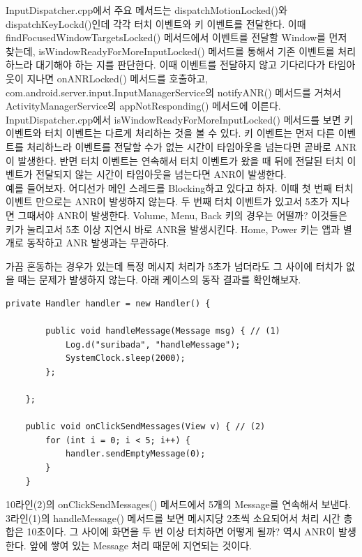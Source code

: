 InputDispatcher.cpp에서 주요 메서드는 dispatchMotionLocked()와 dispatchKeyLockd()인데 각각 터치 이벤트와 키 이벤트를 전달한다. 이때 findFocusedWindowTargetsLocked() 메서드에서 이벤트를 전달할 Window를 먼저 찾는데, isWindowReadyForMoreInputLocked() 메서드를 통해서 기존 이벤트를 처리하느라 대기해야 하는 지를 판단한다.
이때 이벤트를 전달하지 않고 기다리다가 타임아웃이 지나면 onANRLocked() 메서드를 호출하고, com.android.server.input.InputManagerService의 notifyANR() 메서드를 거쳐서 ActivityManagerService의 appNotResponding() 메서드에 이른다.\\

InputDispatcher.cpp에서 isWindowReadyForMoreInputLocked() 메서드를 보면 키 이벤트와 터치 이벤트는 다르게 처리하는 것을 볼 수 있다. 키 이벤트는 먼저 다른 이벤트를 처리하느라 이벤트를 전달할 수가 없는 시간이 타임아웃을 넘는다면 곧바로 ANR이 발생한다. 반면 터치 이벤트는 연속해서 터치 이벤트가 왔을 때 뒤에 전달된 터치 이벤트가 전달되지 않는 시간이 타임아웃을 넘는다면 ANR이 발생한다.\\

예를 들어보자. 
어디선가 메인 스레드를 Blocking하고 있다고 하자.
이때 첫 번째 터치 이벤트 만으로는 ANR이 발생하지 않는다. 두 번째 터치 이벤트가 있고서 5초가 지나면 그때서야 ANR이 발생한다.
Volume, Menu, Back 키의 경우는 어떨까? 이것들은 키가 눌리고서 5초 이상 지연시 바로 ANR을 발생시킨다.
Home, Power 키는 앱과 별개로 동작하고 ANR 발생과는 무관하다.\\

가끔 혼동하는 경우가 있는데 특정 메시지 처리가 5초가 넘더라도 그 사이에 터치가 없을 때는 문제가 발생하지 않는다. 아래 케이스의 동작 결과를 확인해보자. 
\begin{lstlisting}[frame=single] 
 	private Handler handler = new Handler() {

		public void handleMessage(Message msg) { // (1)
			Log.d("suribada", "handleMessage");
			SystemClock.sleep(2000);
		};

	};

	public void onClickSendMessages(View v) { // (2)
		for (int i = 0; i < 5; i++) {
			handler.sendEmptyMessage(0);
		}
	}
\end{lstlisting}
10라인(2)의 onClickSendMessages() 메서드에서 5개의 Message를 연속해서 보낸다.
3라인(1)의 handleMessage() 메서드를 보면 메시지당 2초씩 소요되어서 처리 시간 총합은 10초이다. 그 사이에 화면을 두 번 이상 터치하면 어떻게 될까? 역시 ANR이 발생한다. 앞에 쌓여 있는 Message 처리 때문에 지연되는 것이다.\\

